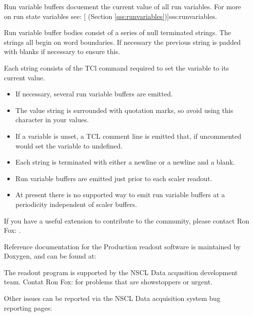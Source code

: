         Run variable buffers docuement the current
         value of all run  variables.  For more on 
         run state variables see:
         [
            (Section \ref{sss:runvariables})]{sss:runvariables}.
         
         Run variable buffer bodies consist of a 
         series of null terminated strings.  The strings
         all begin on word boundaries.  If necessary 
         the previous string is padded with blanks if 
         necessary to ensure this.
         
         Each string consists of the TCl command required
         to set the variable to its current value.
         
         \begin{note}
            \begin{itemize}
               \item If necessary, several run variable
                  buffers are emitted.
               \item The value string is surrounded with
                  quotation marks, so avoid using this
                  character in your values.
               \item If a variable is unset, a TCL comment
                  line is emitted that, if uncommented
                  would set the variable to {\dash}undefined{\dash}.
               \item Each string is terminated with either
                  a newline or a newline and a blank.
               \item Run variable buffers are emitted just
                  prior to each scaler readout.
               \item At present there is no supported way
                  to emit run variable buffers at a 
                  periodicity independent of scaler buffers.
            \end{itemize}
         \end{note}
         
If you have a useful extension to contribute to the community, please
contact Ron Fox: .


	Reference documentation for the Production readout software
	is maintained by Doxygen, and can be found at:

   The readout program is supported by the NSCL Data
   acqusition development team.  Contat
   Ron Fox: 
   for problems that are showstoppers or urgent.
   
   Other issues can be reported via the NSCL Data acquisition
   system bug reporting pages:
